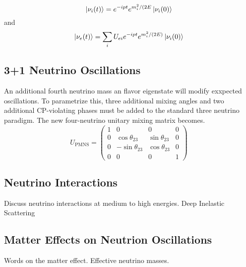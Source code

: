 \documentclass[main.tex]{subfiles}
\begin{document}
\begin{equation}
    \left| \nu_{i} (t) \right >  =  e^{-ipt}e^{ m_{i}^{2}/(2E}\left| \nu_{i} (0) \right >
\end{equation}
and 
\begin{equation}
\left| \nu_{e}(t) \right > = \sum\limits_{i} U_{ei} e^{-ipt}e^{ m_{i}^{2}/(2E)}\left| \nu_{i} (0) \right >
\end{equation}

\subsection{3+1 Neutrino Oscillations}
An additional fourth neutrino mass an flavor eigenstate will modify exxpected oscillations. To parametrize this, three additional mixing angles and two additional CP-violating phases must be added to the standard three neutrino paradigm. The new four-neutrino unitary mixing matrix becomes.
\begin{equation}
    U_{\text{PMNS}} = \left(\begin{array}{cccc} 1 & 0 & 0 & 0 \\ 0&\cos\theta_{23}&\sin\theta_{23}&0 \\ 0&-\sin\theta_{23}&\cos\theta_{23}&0 \\ 0&0&0&1 \end{array}\right)
\end{equation}

\subsection{Neutrino Interactions}
Discuss neutrino interactions at medium to high energies. Deep Inelastic Scattering

\subsection{Matter Effects on Neutrion Oscillations}
Words on the matter effect.  Effective neutrino masses. 
\end{document}

